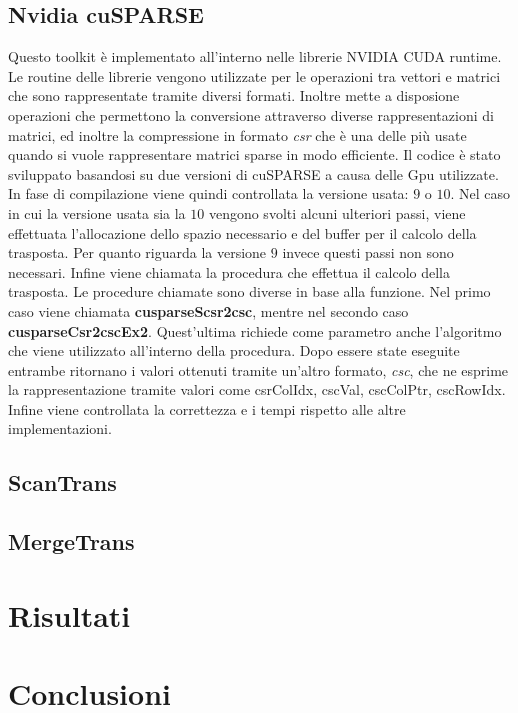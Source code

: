\documentclass[]{IEEEtran}
\begin{document}
	\subsection{Nvidia cuSPARSE}
	Questo toolkit è implementato all'interno nelle librerie NVIDIA CUDA runtime. Le routine delle librerie vengono utilizzate per le operazioni tra vettori e matrici che sono rappresentate tramite diversi formati. Inoltre mette a disposione operazioni che permettono la conversione attraverso diverse rappresentazioni di matrici, ed inoltre la compressione in formato \textit{csr} che è una delle più usate quando si vuole rappresentare matrici sparse in modo efficiente.\newline	
	Il codice è stato sviluppato basandosi su due versioni di cuSPARSE a causa delle Gpu utilizzate. In fase di compilazione viene quindi controllata la versione usata: $ 9 $ o $ 10 $.\newline
	Nel caso in cui la versione usata sia la $ 10 $ vengono svolti alcuni ulteriori passi, viene effettuata l'allocazione dello spazio necessario e del buffer per il calcolo della trasposta. Per quanto riguarda la versione $ 9 $ invece questi passi non sono necessari.\newline
	Infine viene chiamata la procedura che effettua il calcolo della trasposta. \newline
	Le procedure chiamate sono diverse in base alla funzione. Nel primo caso viene chiamata \textbf{cusparseScsr2csc}, mentre nel secondo caso \textbf{cusparseCsr2cscEx2}. Quest'ultima richiede come parametro anche l'algoritmo che viene utilizzato all'interno della procedura.\newline
	Dopo essere state eseguite entrambe ritornano i valori ottenuti tramite un'altro formato, \textit{csc}, che ne esprime la rappresentazione tramite valori come csrColIdx, cscVal, cscColPtr, cscRowIdx. Infine viene controllata la correttezza e i tempi rispetto alle altre implementazioni.

	\subsection{ScanTrans}
	
	
	\subsection{MergeTrans}
	

\section{Risultati}

\section{Conclusioni}







\end{document}
